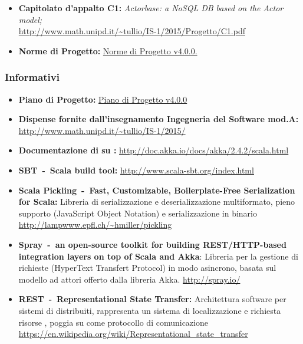 \documentclass{scalatekids-article}
\begin{document}
\begin{itemize}

\item\textbf{Capitolato d'appalto C1:} \textit{Actorbase: a NoSQL DB based on the Actor model;}\\
  \url{http://www.math.unipd.it/~tullio/IS-1/2015/Progetto/C1.pdf}
\item\textbf{Norme di Progetto:}
  \href{run:../Interni/NormeDiProgetto\_v4.0.0.pdf}{Norme di Progetto v4.0.0.}
\end{itemize}

\subsubsection{Informativi}

\begin{itemize}
\item\textbf{Piano di Progetto:} \href{run:./PianoDiProgetto\_v4.0.0.pdf}{Piano di Progetto v4.0.0}
\item\textbf{Dispense fornite dall'insegnamento Ingegneria del Software mod.A:}\\
  \url{http://www.math.unipd.it/~tullio/IS-1/2015/}
\item\textbf{Documentazione di  su :}
  \url{http://doc.akka.io/docs/akka/2.4.2/scala.html}
\item\textbf{SBT\ -\ Scala build tool:}
  \url{http://www.scala-sbt.org/index.html}
\item\textbf{Scala Pickling\ -\ Fast, Customizable, Boilerplate-Free Serialization for Scala:} Libreria di serializzazione e deserializzazione
  multiformato, pieno supporto  (JavaScript Object Notation) e
  serializzazione in binario \url{http://lampwww.epfl.ch/~hmiller/pickling}
\item\textbf{Spray\ -\ an open-source toolkit for building REST/HTTP-based integration layers on top of Scala and Akka}:
  Libreria per la gestione di richieste (HyperText Transfert Protocol) in modo asincrono, basata sul modello ad
  attori offerto dalla libreria Akka. \url{http://spray.io/}
\item\textbf{REST\ -\ Representational State Transfer:} Architettura software
  per sistemi di  distribuiti, rappresenta un sistema di
  localizzazione e richiesta risorse , poggia su 
  come protocollo di comunicazione \url{https://en.wikipedia.org/wiki/Representational_state_transfer}
\end{itemize}
\end{document}
